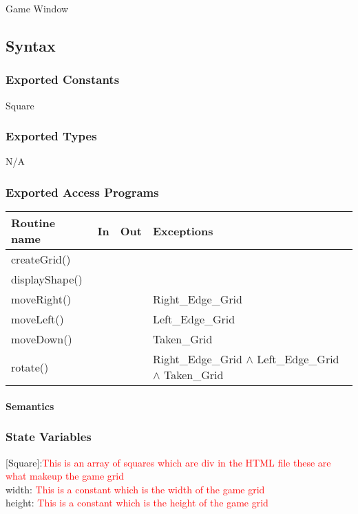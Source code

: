 \documentclass[12pt]{article}
\begin{document}
Game Window

\subsection*{Syntax}

\subsubsection*{Exported Constants}

Square

\subsubsection*{Exported Types}

N/A

\subsubsection* {Exported Access Programs}

\begin{tabular}{| l | l | l | l |}
\hline
\textbf{Routine name} & \textbf{In} & \textbf{Out} & \textbf{Exceptions}\\
\hline
createGrid() &  & &\\
\hline
displayShape() &  &  &\\
\hline
moveRight() &  &   &Right\_Edge\_Grid\\
\hline
moveLeft() &   &   &Left\_Edge\_Grid\\
\hline
moveDown() &  & & Taken\_Grid \\
\hline
rotate() & &  &Right\_Edge\_Grid $\land$ Left\_Edge\_Grid $\land$ Taken\_Grid \\
\hline
\end{tabular}

\paragraph* {Semantics}

\subsubsection*{State Variables}

[Square]:\textcolor{red}{This is an array of squares which are div in the HTML file these are what makeup the game grid}\\ width: \textcolor{red}{This is a constant which is the width of the game grid}\\ height: \textcolor{red}{This is a constant which is the height of the game grid}
\end{document}
